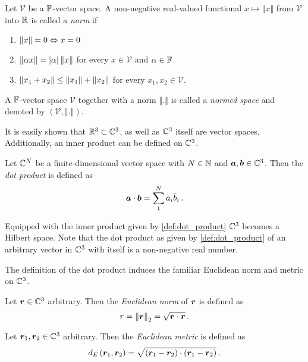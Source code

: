 \begin{definition}\label{def:norm}
	Let $\mathcal{V}$ be a $\mathbb{F}$-vector space.
	A non-negative real-valued functional $x \mapsto \left\Vert x \right\Vert$
	from $\mathcal{V}$ into $\mathbb{R}$ is called a \emph{norm} if
	\begin{enumerate}[label=(\alph*)]
		\item $\left\Vert x \right\Vert = 0 \Leftrightarrow x = 0$ 
		\item $\left\Vert \alpha x \right\Vert = \left\vert\alpha\right\vert \left\Vert x \right\Vert$ for every
		$x \in \mathcal{V}$ and $\alpha \in \mathbb{F}$
		\item $\left\Vert x_1 + x_2 \right\Vert \le \left\Vert x_1 \right\Vert + \left\Vert x_2 \right\Vert$ for every
		$x_1, x_2 \in \mathcal{V}$.
	\end{enumerate}
	A $\mathbb{F}$-vector space $\mathcal{V}$ together with a norm
	$\left\Vert . \right\Vert$ is called a \emph{normed space} and denoted by
	$\left( \mathcal{V}, \left\Vert . \right\Vert \right)$.
\end{definition}

It is easily shown that $\mathbb{R}^3 \subset \mathbb{C}^3$, as well as $\mathbb{C}^3$ itself are
vector spaces.
Additionally, an inner product can be defined on $\mathbb{C}^3$.
\begin{definition}\label{def:dot_product}
	Let $\mathbb{C}^N$ be a finite-dimensional vector space with $N \in \mathbb{N}$
	and $\pvec{a}, \pvec{b} \in \C^3$. Then the \emph{dot product}
	is defined as 
	\begin{equation}
		\pvec{a} \cdot \pvec{b} = \sum\limits_{1}^{N} a_i \bar{b}_i \, .
	\end{equation}
\end{definition}
Equipped with the inner product given by \cref{def:dot_product} $\mathbb{C}^3$
becomes a Hilbert space.
Note that the dot product as given by \cref{def:dot_product} of an arbitrary
vector in $\mathbb{C}^3$ with itself is a non-negative real number. 

The definition of the dot product induces the familiar Euclidean norm and
metric on $\mathbb{C}^3$.
\begin{definition}\label{def:euclidean_norm}
	Let $\pvec{r} \in \C^3$ arbitrary. Then the \emph{Euclidean norm} of
	$\pvec{r}$ is defined as
	\begin{equation}
		r = \euclideanNorm{\pvec{r}} = \sqrt{\pvec{r} \cdot \pvec{r}} \, .
	\end{equation}
\end{definition}\label{def:euclidean_metric}
\begin{definition}
	Let $\pvec{r}_1, \pvec{r}_2 \in \C^3$ arbitrary. Then the \emph{Euclidean
	metric} is defined as
	\begin{equation}
		d_E\left(\pvec{r}_1 , \pvec{r}_2\right) = 
		\sqrt{
			\left(\pvec{r}_1 - \pvec{r}_2\right)
			\cdot
			\left(\pvec{r}_1 - \pvec{r}_2\right)
		} \, .
	\end{equation}
\end{definition}

